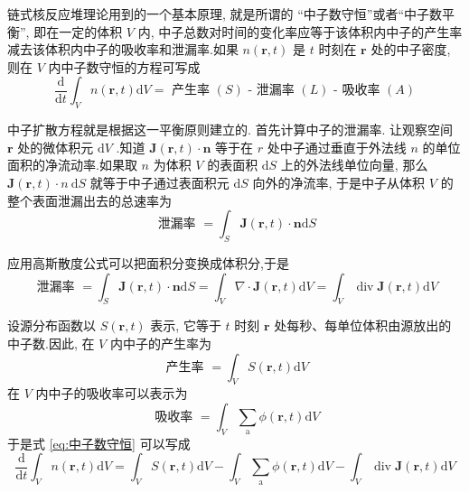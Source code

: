 \documentclass{Sichuan Normal University}
\begin{document}
链式核反应堆理论用到的一个基本原理, 就是所谓的 “中子数守恒”或者“中子数平衡”, 即在一定的体积 $V$ 内, 中子总数对时间的变化率应等于该体积内中子的产生率减去该体积内中子的吸收率和泄漏率.如果 $n(\boldsymbol{r}, t)$ 是 $t$ 时刻在 $\boldsymbol{r}$ 处的中子密度, 则在 $V$ 内中子数守恒的方程可写成
\begin{equation}
    \frac{\mathrm{d}}{\mathrm{d} t} \int_V n(\boldsymbol{r}, t) \mathrm{d} V=\text { 产生率 }(S) \text { - 泄漏率 }(L) \text { - 吸收率 }(A)
    \label{eq:中子数守恒}
\end{equation}

中子扩散方程就是根据这一平衡原则建立的.
首先计算中子的泄漏率.
让观察空间 $\boldsymbol{r}$ 处的微体积元 $\mathrm{d} V$ .知道 $\boldsymbol{J}(\boldsymbol{r}, t) \cdot \boldsymbol{n}$ 等于在 $r$ 处中子通过垂直于外法线 $n$ 的单位面积的净流动率.如果取 $n$ 为体积 $V$ 的表面积 $\mathrm{d} S$ 上的外法线单位向量, 那么 $\boldsymbol{J}(\boldsymbol{r}, t) \cdot n \mathrm{~d} S$ 就等于中子通过表面积元 $\mathrm{d} S$ 向外的净流率, 于是中子从体积 $V$ 的整个表面泄漏出去的总速率为
\begin{equation}
    \text { 泄漏率 }=\int_S \boldsymbol{J}(\boldsymbol{r}, t) \cdot \boldsymbol{n} \mathrm{d} S
    \label{eq:泄漏率}
\end{equation}

应用高斯散度公式可以把面积分变换成体积分,于是
\begin{equation}
    \text { 泄漏率 }=\int_S \boldsymbol{J}(\boldsymbol{r}, t) \cdot \boldsymbol{n} \mathrm{d} S=\int_V \nabla \cdot \boldsymbol{J}(\boldsymbol{r}, t) \mathrm{d} V=\int_V \operatorname{div} \boldsymbol{J}(\boldsymbol{r}, t) \mathrm{d} V
    \label{eq:泄漏率2}
\end{equation}

设源分布函数以 $S(\boldsymbol{r}, t)$ 表示, 它等于 $t$ 时刻 $\boldsymbol{r}$ 处每秒、每单位体积由源放出的中子数.因此, 在 $V$ 内中子的产生率为
\begin{equation}
    \text { 产生率 }=\int_V S(\boldsymbol{r}, t) \mathrm{d} V
    \label{eq:产生率}
\end{equation}
在 $V$ 内中子的吸收率可以表示为
\begin{equation}
    \text { 吸收率 }=\int_V \sum_{\mathrm{a}} \phi(\boldsymbol{r}, t) \mathrm{d} V
    \label{eq:吸收率}
\end{equation}
于是式 \eqref{eq:中子数守恒} 可以写成
\begin{equation}
    \frac{\mathrm{d}}{\mathrm{d} t} \int_V n(\boldsymbol{r}, t) \mathrm{d} V=\int_V S(\boldsymbol{r}, t) \mathrm{d} V-\int_V \sum_{\mathrm{a}} \phi(\boldsymbol{r}, t) \mathrm{d} V-\int_V \operatorname{div} \boldsymbol{J}(\boldsymbol{r}, t) \mathrm{d} V
    \label{eq:中子数守恒2}
\end{equation}
\end{document}
